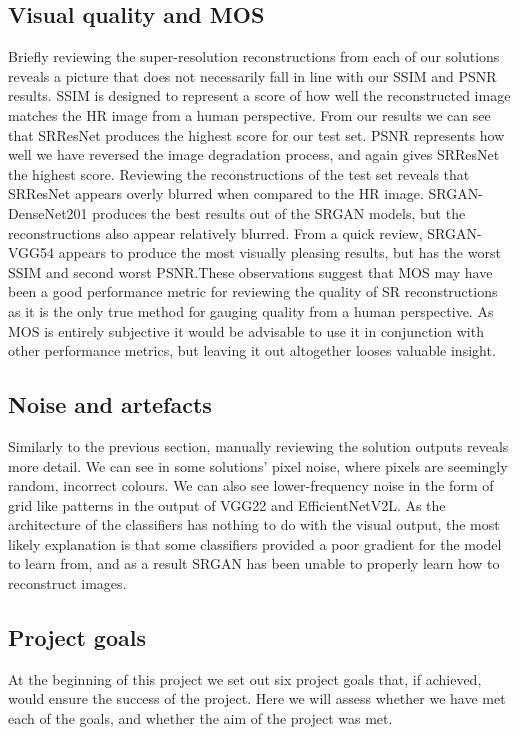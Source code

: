 \subsection{Visual quality and MOS}
Briefly reviewing the super-resolution reconstructions from each of our solutions reveals a picture that does not necessarily fall in line with our SSIM and PSNR results. SSIM is designed to represent a score of how well the reconstructed image matches the HR image from a human perspective. From our results we can see that SRResNet produces the highest score for our test set. PSNR represents how well we have reversed the image degradation process, and again gives SRResNet the highest score. Reviewing the reconstructions of the test set reveals that SRResNet appears overly blurred when compared to the HR image. SRGAN-DenseNet201 produces the best results out of the SRGAN models, but the reconstructions also appear relatively blurred. From a quick review, SRGAN-VGG54 appears to produce the most visually pleasing results, but has the worst SSIM and second worst PSNR.\@ These observations suggest that MOS may have been a good performance metric for reviewing the quality of SR reconstructions as it is the only true method for gauging quality from a human perspective. As MOS is entirely subjective it would be advisable to use it in conjunction with other performance metrics, but leaving it out altogether looses valuable insight.

\subsection{Noise and artefacts}
Similarly to the previous section, manually reviewing the solution outputs reveals more detail. We can see in some solutions' pixel noise, where pixels are seemingly random, incorrect colours. We can also see lower-frequency noise in the form of grid like patterns in the output of VGG22 and EfficientNetV2L. As the architecture of the classifiers has nothing to do with the visual output, the most likely explanation is that some classifiers provided a poor gradient for the model to learn from, and as a result SRGAN has been unable to properly learn how to reconstruct images.

\subsection{Project goals}
At the beginning of this project we set out six project goals that, if achieved, would ensure the success of the project. Here we will assess whether we have met each of the goals, and whether the aim of the project was met.

